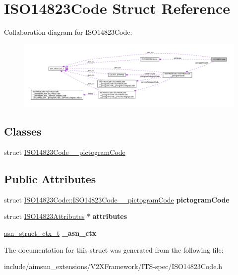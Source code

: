 \hypertarget{structISO14823Code}{}\section{I\+S\+O14823\+Code Struct Reference}
\label{structISO14823Code}


Collaboration diagram for I\+S\+O14823\+Code\+:\nopagebreak
\begin{figure}[H]
\begin{center}
\leavevmode
\includegraphics[width=350pt]{structISO14823Code__coll__graph}
\end{center}
\end{figure}
\subsection*{Classes}
\begin{DoxyCompactItemize}
\item 
struct \hyperlink{structISO14823Code_1_1ISO14823Code____pictogramCode}{I\+S\+O14823\+Code\+\_\+\+\_\+pictogram\+Code}
\end{DoxyCompactItemize}
\subsection*{Public Attributes}
\begin{DoxyCompactItemize}
\item 
struct \hyperlink{structISO14823Code_1_1ISO14823Code____pictogramCode}{I\+S\+O14823\+Code\+::\+I\+S\+O14823\+Code\+\_\+\+\_\+pictogram\+Code} {\bfseries pictogram\+Code}\hypertarget{structISO14823Code_abfe975e7178e45070778e08ac6819263}{}\label{structISO14823Code_abfe975e7178e45070778e08ac6819263}

\item 
struct \hyperlink{structISO14823Attributes}{I\+S\+O14823\+Attributes} $\ast$ {\bfseries attributes}\hypertarget{structISO14823Code_aaa0aba3d6fdbebfc7ecbc6aace84981c}{}\label{structISO14823Code_aaa0aba3d6fdbebfc7ecbc6aace84981c}

\item 
\hyperlink{structasn__struct__ctx__s}{asn\+\_\+struct\+\_\+ctx\+\_\+t} {\bfseries \+\_\+asn\+\_\+ctx}\hypertarget{structISO14823Code_a55da70721eb6a9c20488f9b5b535037f}{}\label{structISO14823Code_a55da70721eb6a9c20488f9b5b535037f}

\end{DoxyCompactItemize}


The documentation for this struct was generated from the following file\+:\begin{DoxyCompactItemize}
\item 
include/aimsun\+\_\+extensions/\+V2\+X\+Framework/\+I\+T\+S-\/spec/I\+S\+O14823\+Code.\+h\end{DoxyCompactItemize}
